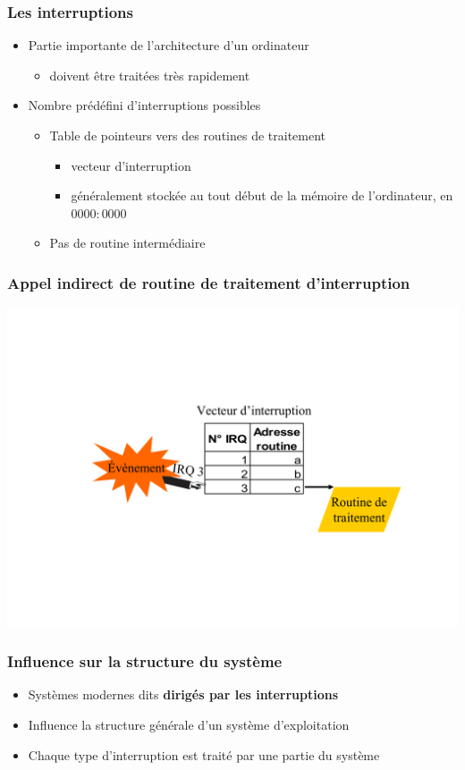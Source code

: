 \begin{frame}
 \frametitle{Les interruptions}
 \begin{itemize}
 \item Partie importante de l’architecture d’un ordinateur
\begin{itemize}
\item doivent être traitées très rapidement
\end{itemize}
\item Nombre prédéfini d’interruptions possibles
\begin{itemize}
\item Table de pointeurs vers des routines de traitement
\begin{itemize}
\item vecteur d’interruption
\item généralement stockée au tout début de la mémoire de l'ordinateur, en $0000:0000$
\end{itemize}
\item Pas de routine intermédiaire
\end{itemize}
 \end{itemize}
\end{frame}


\begin{frame}
 \frametitle{Appel indirect de routine de traitement d’interruption}
 \includegraphics[width=\textwidth]{../illustration/derout_interruption.pdf}
\end{frame}


\begin{frame}
 \frametitle{Influence sur la structure du système}
 \begin{itemize}
 \item Systèmes modernes dits \textbf{dirigés par les interruptions}
 \item Influence la structure générale d’un système d’exploitation
 \item Chaque type d’interruption est traité par une partie du système
 \end{itemize}
\end{frame}


